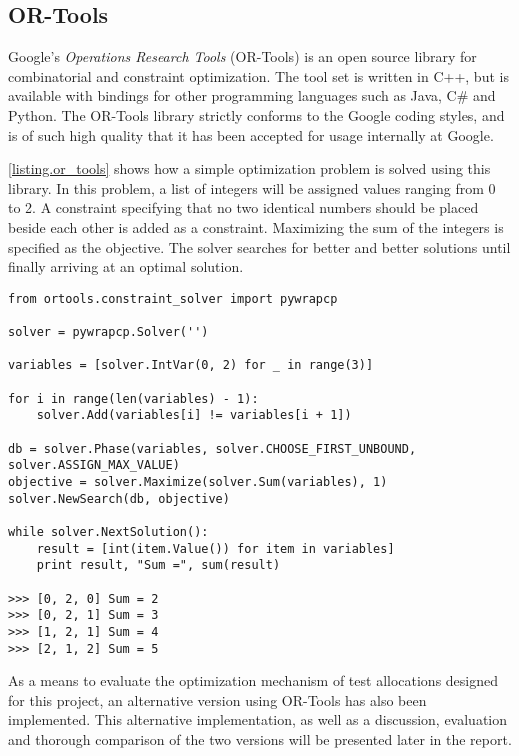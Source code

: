 \subsection{OR-Tools}\label{subsection.ortools}
Google's \emph{Operations Research Tools} (OR-Tools) \cite{ortools} is an open source library for combinatorial and constraint optimization. The tool set is written in C++, but is available with bindings for other programming languages such as Java, C\# and Python. The OR-Tools library strictly conforms to the Google coding styles, and is of such high quality that it has been accepted for usage internally at Google.

\lstlistingname \space \ref{listing.or_tools} shows how a simple optimization problem is solved using this library. In this problem, a list of integers will be assigned values ranging from 0 to 2. A constraint specifying that no two identical numbers should be placed beside each other is added as a constraint. Maximizing the sum of the integers is specified as the objective. The solver searches for better and better solutions until finally arriving at an optimal solution.

\vspace{4mm}
\begin{lstlisting}[caption=OR-Tool Implementation, label={listing.or_tools}]
from ortools.constraint_solver import pywrapcp

solver = pywrapcp.Solver('')

variables = [solver.IntVar(0, 2) for _ in range(3)]

for i in range(len(variables) - 1):
    solver.Add(variables[i] != variables[i + 1])

db = solver.Phase(variables, solver.CHOOSE_FIRST_UNBOUND, solver.ASSIGN_MAX_VALUE)
objective = solver.Maximize(solver.Sum(variables), 1)
solver.NewSearch(db, objective)

while solver.NextSolution():
    result = [int(item.Value()) for item in variables]
    print result, "Sum =", sum(result)

>>> [0, 2, 0] Sum = 2
>>> [0, 2, 1] Sum = 3
>>> [1, 2, 1] Sum = 4
>>> [2, 1, 2] Sum = 5
\end{lstlisting}

As a means to evaluate the optimization mechanism of test allocations designed for this project, an alternative version using OR-Tools has also been implemented. This alternative implementation, as well as a discussion, evaluation and thorough comparison of the two versions will be presented later in the report.